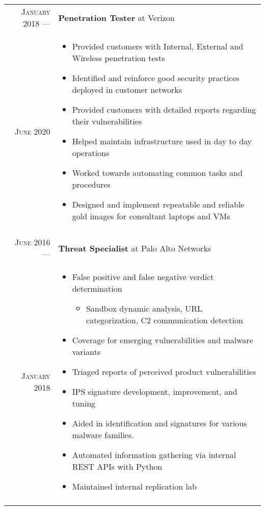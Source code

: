 \documentclass[a4paper,10pt]{article}
\begin{document}
\begin{tabular}{r|p{11cm}}
 \textsc{January 2018} ---            & \textbf {Penetration Tester} at Verizon \\
 \textsc{June 2020} \hphantom{---} & \footnotesize{
        \vspace{-2mm}
        \begin{itemize}[leftmargin=*]
            \item Provided customers with Internal, External and Wireless penetration tests
            \item Identified and reinforce good security practices deployed in customer networks
            \item Provided customers with detailed reports regarding their vulnerabilities
            \item Helped maintain infrastructure used in day to day operations
            \item Worked towards automating common tasks and procedures
            \item Designed and implement repeatable and reliable gold images for consultant laptops and VMs
        \end{itemize}
        \vspace*{-\baselineskip}
    }\\
 \multicolumn{2}{c}{} \\

 \textsc{June 2016} ---            & \textbf {Threat Specialist} at Palo Alto Networks \\
 \textsc{January 2018} \hphantom{---} & \footnotesize{
        \vspace{-2mm}
        \begin{itemize}[leftmargin=*]
            \item False positive and false negative verdict determination
            \begin{itemize}
                \item Sandbox dynamic analysis, URL categorization, C2 communication detection
            \end{itemize}
            \item Coverage for emerging vulnerabilities and malware variants
            \item Triaged reports of perceived product vulnerabilities 
            \item IPS signature development, improvement, and tuning 
            \item Aided in identification and signatures for various malware families.
            \item Automated information gathering via internal REST APIs with Python
            \item Maintained internal replication lab
        \end{itemize}
        \vspace*{-\baselineskip}
    }\\
 \multicolumn{2}{c}{} \\


\end{tabular}
\end{document}
